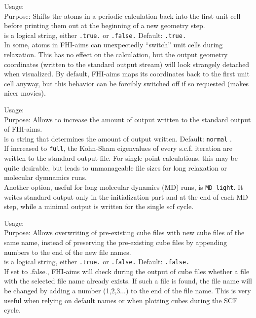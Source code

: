 {
  \noindent
  Usage:   \\[1.0ex]
  Purpose: Shifts the atoms in a periodic calculation back into the
    first unit cell before printing them out at the beginning of a new
    geometry step. \\[1.0ex]
   is a logical string, either \texttt{.true.} or
    \texttt{.false.} Default: \texttt{.true.} \\
}
In some, atoms in FHI-aims can unexpectedly ``switch'' unit cells
during relaxation. This has no effect on the calculation, but the
output geometry coordinates (written to the standard output stream)
will look strangely detached when visualized. By default, FHI-aims
maps its coordinates back to the first unit cell anyway, but this
behavior can be forcibly switched off if so requested (makes nicer
movies).

{
  \noindent
  Usage:   \\[1.0ex]
  Purpose: Allows to increase the amount of output written to the
    standard output of FHI-aims. \\[1.0ex]
   is a string that determines the amount of output
    written. Default: \texttt{normal} . \\
}
If increased to \texttt{full}, the Kohn-Sham eigenvalues of every
s.c.f. iteration are written to the standard output file. For
single-point calculations, this may be quite desirable, but leads to
unmanageable file sizes for long relaxation or molecular dymnamics
runs. \\
Another option, useful for long molecular dynamics (MD) runs, is \texttt{MD\_light}.
It writes standard output only in the initialization part and at the end of each
MD step, while a minimal output is written for the single scf cycle.

{
  \noindent
  Usage:   \\[1.0ex]
  Purpose: Allows overwriting of pre-existing cube files with new cube files of
    the same name, instead of preserving the pre-existing cube files by
    appending numbers to the end of the new file names. \\[1.0ex]
   is a logical string, either \texttt{.true.} or
    \texttt{.false.} Default: \texttt{.false.} \\
}
If set to .false., FHI-aims will check during the output of cube files whether a
file with the selected file name already exists. If such a file is found, the
file name will be changed by adding a number (1,2,3...) to the end of the file
name. This is very useful when relying on default names or when plotting cubes
during the SCF cycle.

